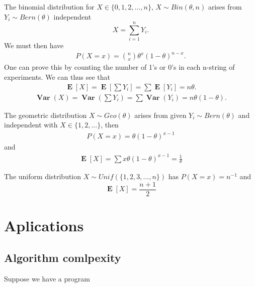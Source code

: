 \documentclass{article}
\theoremstyle{problemstyle}
\DeclareMathOperator{\Var}{\mathbf{Var}}
\DeclareMathOperator{\E}{\mathbf{E}}
\begin{document}
\begin{example}[Binomial]
  The binomial distribution for $ X \in \{0,1,2,\dots,n\} $, $ X\sim Bin(\theta, n) $ arises from $ Y_i\sim Bern(\theta) $ independent
  \[
    X = \sum_{i=1}^n Y_i.
  \]
  We must then have
  \begin{align*}
    P(X=x) = {n\choose x} \theta^x (1-\theta)^{n-x}.
  \end{align*}
  One can prove this by counting the number of 1's or 0's in each n-string of experiments. We can thus see that
  \begin{align*}
    \E[X] = \E\left[\sum Y_i\right] = \sum \E[Y_i] = n\theta.
  \end{align*}
  \begin{align}
    \Var(X) = \Var(\sum Y_i) = \sum \Var(Y_i) = n\theta(1-\theta).
  \end{align}
\end{example}

\begin{example}[Geometric]
  The geometric distribution $ X\sim Geo(\theta) $ arises from given $ Y_i \sim Bern(\theta) $ and independent with $ X\in \{1,2,\dots\} $, then
  \begin{align}
    P(X=x) = \theta(1-\theta)^{x-1}
  \end{align}
  and 
  \begin{align*}
    \E[X] = \sum x \theta(1-\theta)^{x-1} = \frac{1}{\theta}
  \end{align*}
  
\end{example}

\begin{example}[Uniform]
  The uniform distribution $ X\sim Unif(\{1,2,3,\dots, n\}) $ has $ P(X=x) = n^{-1} $ and
  \[
    \E[X] = \displaystyle\frac{n+1}{2}
  \]
\end{example}


\section{Aplications}\label{sec:aplications} %
\subsection{Algorithm comlpexity}
Suppose we have a program 

\end{document}
